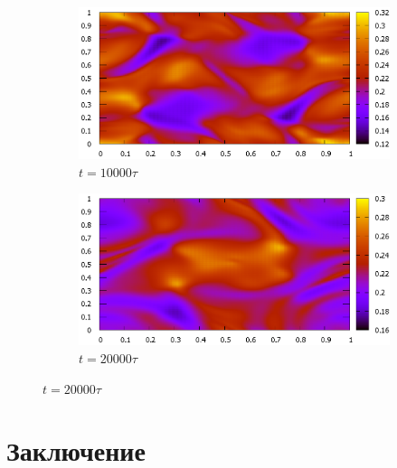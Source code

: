 \documentclass[14pt, a4paper, fleqn]{extreport}
\begin{document}
    \begin{figure}[H]
        \centering
        \caption{$\rho$.}
        \begin{subfigure}{0.9\textwidth}
            \centering
            \caption{$t = 10000\tau$}
            \includegraphics[width=\textwidth]{2D_HLLC_OT_10000.eps}
        \end{subfigure}
        \begin{subfigure}{0.9\textwidth}
            \centering
            \caption{$t = 20000\tau$}
            \includegraphics[width=\textwidth]{2D_HLLC_OT_20000.eps}
        \end{subfigure}
    \end{figure}
    
    \chapter*{Заключение}
    
\end{document}
